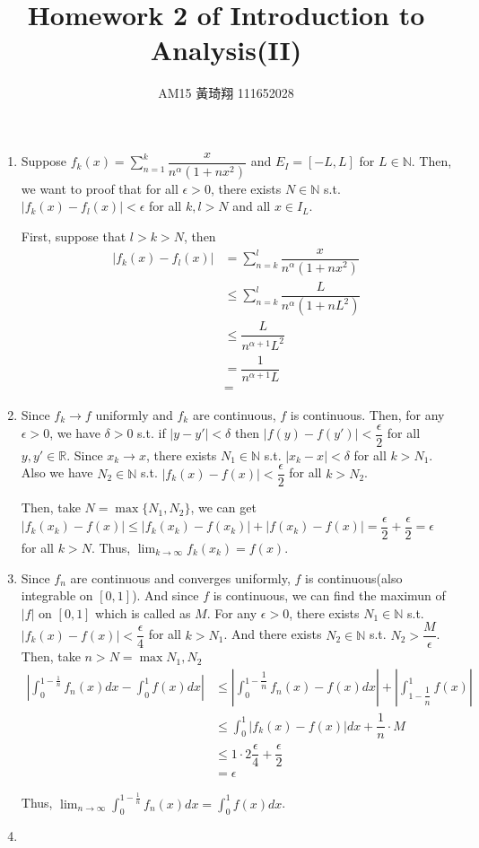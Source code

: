 \documentclass[12pt]{article}
\title{Homework 2 of Introduction to Analysis(II)}
\author{AM15 黃琦翔 111652028}
\begin{document}
\maketitle
\begin{enumerate}
    \item Suppose $f_k(x) = \displaystyle\sum_{n=1}^{k} \dfrac{x}{n^\alpha (1+nx^2)}$ and $E_I = [-L, L]$ for $L \in \mathbb{N}$.
    Then, we want to proof that 
    for all $\epsilon > 0$, there exists $N \in \mathbb{N}$ s.t. 
    $|f_k(x) - f_l(x)| < \epsilon$ for all $k, l > N$ and all $x \in I_L$.

    First, suppose that $l > k > N$, then \begin{align*}
        |f_k(x) - f_l(x)| &= \sum_{n=k}^l \dfrac{x}{n^\alpha (1+nx^2)}\\
        &\leq \sum_{n=k}^{l} \dfrac{L}{n^\alpha(1+nL^2)}\\
        &\leq \dfrac{L}{n^{\alpha+1} L^2}\\
        &= \dfrac{1}{n^{\alpha+1} L}\\
        &= 
    \end{align*}


    \item Since $f_k \to f$ uniformly and $f_k$ are continuous, $f$ is continuous.
    Then, for any $\epsilon > 0$, we have $\delta > 0 $ s.t. if $|y - y'| < \delta$ then $|f(y) - f(y')| < \dfrac{\epsilon}{2}$ for all $y, y' \in \mathbb{R}$.
    Since $x_k \to x$, there exists $N_1 \in \mathbb{N}$ s.t. $|x_k - x| < \delta$ for all $k > N_1$.
    Also we have $N_2 \in \mathbb{N}$ s.t. $|f_k(x) - f(x)| < \dfrac{\epsilon}{2}$ for all $k > N_2$.

    Then, take $N  = \max\{ N_1, N_2\}$, we can get $|f_k(x_k) - f(x)| \leq |f_k(x_k) - f(x_k)| + |f(x_k) - f(x)| = \dfrac{\epsilon}{2} + \dfrac{\epsilon}{2} = \epsilon$ for all $k > N$.
    Thus, $\displaystyle\lim_{k\to\infty} f_k(x_k) = f(x)$.

    \item Since $f_n$ are continuous and converges uniformly, $f$ is continuous(also integrable on $[0, 1]$).
    And since $f$ is continuous, we can find the maximun of $|f|$ on $[0, 1]$ which is called as $M$.
    For any $\epsilon > 0$, there exists $N_1 \in \mathbb{N}$ s.t. $|f_k(x) - f(x)| < \dfrac{\epsilon}{4}$ for all $k > N_1$.
    And there exists $N_2 \in \mathbb{N}$ s.t. $N_2 > \dfrac{M}{\epsilon}$.
    Then, take $n > N = \max{N_1, N_2}$ \begin{align*}
        \left|\int_0^{1-\frac{1}{n}} f_n(x) dx - \int_0^1 f(x) dx\right| &\leq \left|\int_{0}^{1-\dfrac{1}{n}} f_n(x) - f(x) dx\right| + \left|\int_{1-\dfrac{1}{n}}^{1} f(x)\right|\\
        &\leq \int_0^1 |f_k(x) - f(x)| dx + \dfrac{1}{n} \cdot M\\
        &\leq 1 \cdot 2\dfrac{\epsilon}{4} + \dfrac{\epsilon}{2}\\
        &= \epsilon
    \end{align*}

    Thus, $\displaystyle\lim_{n\to\infty} \displaystyle\int_{0}^{1-\frac{1}{n}} f_n(x) dx = \displaystyle\int_0^1 f(x) dx$.

    \item 
\end{enumerate}
\end{document}
